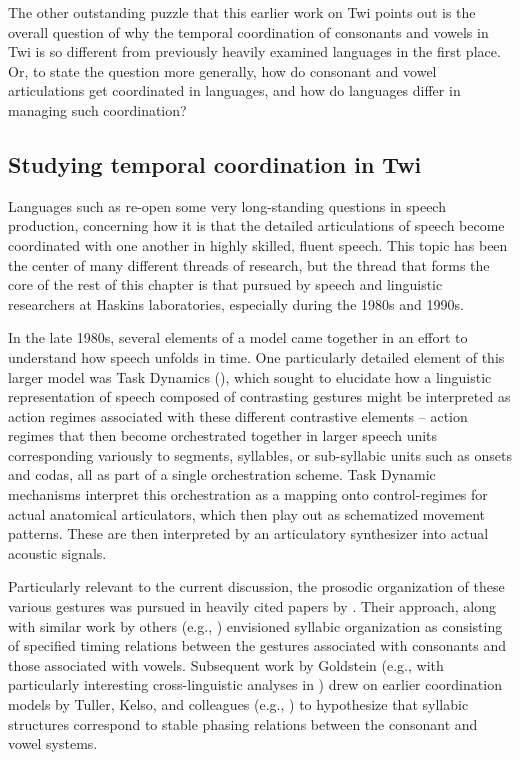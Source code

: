 \documentclass[output=paper,colorlinks,citecolor=brown]{langscibook}
\begin{document}
The other outstanding puzzle that this earlier work on Twi points out is the overall question of why the temporal coordination of consonants and vowels in Twi is so different from previously heavily examined languages in the first place. Or, to state the question more generally, how do consonant and vowel articulations get coordinated in languages, and how do languages differ in managing such coordination?

\subsection{Studying temporal coordination in Twi}

Languages such as  re-open some very long-standing questions in speech production, concerning how it is that the detailed articulations of speech become coordinated with one another in highly skilled, fluent speech. This topic has been the center of many different threads of research, but the thread that forms the core of the rest of this chapter is that pursued by speech and linguistic researchers at Haskins laboratories, especially during the 1980s and 1990s. 

In the late 1980s, several elements of a  model came together in an effort to understand how speech unfolds in time. One particularly detailed element of this larger model was Task Dynamics (\cite{SalzmanMunhall1989}), which sought to elucidate how a linguistic representation of speech composed of contrasting gestures might be interpreted as action regimes associated with these different contrastive elements -- action regimes that then become orchestrated together in larger speech units corresponding variously to segments, syllables, or sub-syllabic units such as onsets and codas, all as part of a single orchestration scheme. Task Dynamic mechanisms interpret this orchestration as a mapping onto control-regimes for actual anatomical articulators, which then play out as schematized movement patterns. These are then interpreted by an articulatory synthesizer into actual acoustic signals. 

Particularly relevant to the current discussion, the prosodic organization of these various gestures was pursued in heavily cited papers by \citet{BrowmanGoldstein1986, BrowmanGoldstein1990}. Their approach, along with similar work by others (e.g., \citealt{deJong2003}) envisioned syllabic organization as consisting of specified timing relations between the gestures  associated with consonants and those associated with vowels. Subsequent work by Goldstein (e.g., with particularly interesting cross-linguistic analyses in \cite{Goldsteinetal2007}) drew on earlier coordination models by Tuller, Kelso, and colleagues (e.g., \cite{TullerKelso1991}) to hypothesize that syllabic structures correspond to stable phasing relations between the consonant and vowel systems. 
\end{document}
